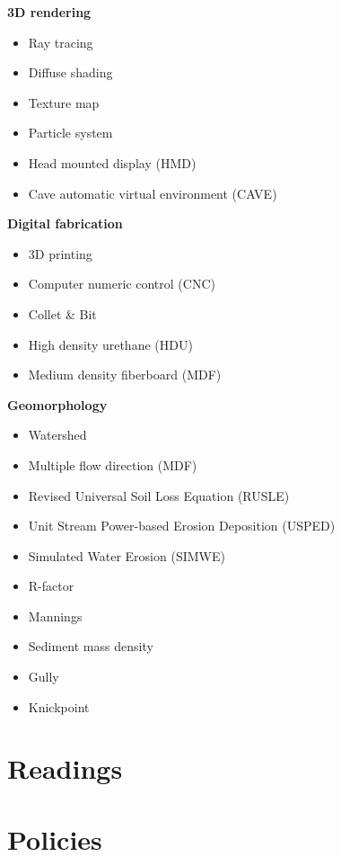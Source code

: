 \documentclass[11pt,article,oneside]{memoir}
\begin{document}
\begin{multicols}{2}
\textbf{3D rendering}
\begin{itemize}
\item Ray tracing
\item Diffuse shading
\item Texture map
\item Particle system
\item Head mounted display (HMD)
\item Cave automatic virtual environment (CAVE)
\end{itemize}

\textbf{Digital fabrication}
\begin{itemize}
\item 3D printing
\item Computer numeric control (CNC)
\item Collet \& Bit
\item High density urethane (HDU)
\item Medium density fiberboard (MDF)
\end{itemize}

\textbf{Geomorphology}
\begin{itemize}
\item Watershed
\item Multiple flow direction (MDF)
\item Revised Universal Soil Loss Equation (RUSLE)
\item Unit Stream Power-based Erosion Deposition (USPED)
\item Simulated Water Erosion (SIMWE)
\item R-factor
\item Mannings
\item Sediment mass density
\item Gully
\item Knickpoint
\end{itemize}
%
\end{multicols}

\clearpage

\section{Readings}
\vspace*{0.5cm}
\nocite{*}
\setlength{}
\printbibliography[heading=none]
\clearpage
\section{Policies}
\end{document}
